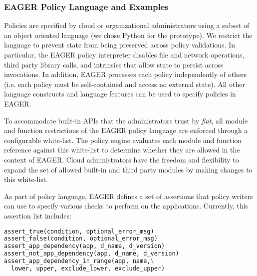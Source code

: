 \subsubsection{EAGER Policy Language and Examples}
\label{sec:policy-lang}
Policies are specified by cloud
or organizational administrators using a subset of an object oriented language
(we chose Python for the prototype).
We restrict the language to prevent state from being preserved across
policy validations. In particular, the EAGER policy interpreter disables 
file and network operations, third party library calls, 
and intrinsics that allow
state to persist across invocations.  
In addition, EAGER processes each 
policy independently of others (i.e. each policy must be self-contained and 
access no external state).  All other language constructs and 
language features can be used to specify policies in EAGER.

To accommodate built-in APIs that the administrators trust by {\em fiat},
all module and function restrictions of the EAGER policy language are enforced
through a configurable white-list. The policy engine evaluates each module and function
reference against this white-list to determine whether they are allowed in the context of
EAGER. Cloud administrators have the freedom
and flexibility to expand the set of allowed built-in and third party modules by making
changes to this white-list.

As part of policy language, EAGER
defines a set of assertions that policy writers can use to specify various 
checks to perform on the applications. 
Currently, this assertion list includes:

\vspace{0.05in}
{\footnotesize 
\begin{lstlisting}[language=Python, frame=single]
assert_true(condition, optional_error_msg)
assert_false(condition, optional_error_msg)
assert_app_dependency(app, d_name, d_version)
assert_not_app_dependency(app, d_name, d_version)
assert_app_dependency_in_range(app, name,\
  lower, upper, exclude_lower, exclude_upper)
\end{lstlisting}
}


